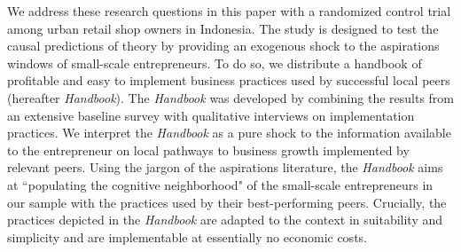 \documentclass[11.5pt]{article}
\begin{document}

We address these research questions in this paper with a randomized control trial among urban retail shop owners in Indonesia. The study is designed to test the causal predictions of theory by providing an exogenous shock to the aspirations windows of small-scale entrepreneurs. To do so, we distribute a handbook of profitable and easy to implement business practices used by successful local peers (hereafter \emph{Handbook}). The \emph{Handbook} was developed by combining the results from an extensive baseline survey with qualitative interviews on implementation practices. We interpret the \emph{Handbook} as a pure shock to the information available to the entrepreneur on local pathways to business growth implemented by relevant peers. Using the jargon of the aspirations literature, the \emph{Handbook} aims at ``populating the cognitive neighborhood" of the small-scale entrepreneurs in our sample with the practices used by their best-performing peers. Crucially, the practices depicted in the \emph{Handbook} are adapted to the context in suitability and simplicity and are implementable at essentially no economic costs.
\end{document}
